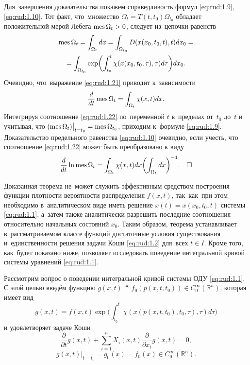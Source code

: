  Для~завершения доказательства покажем справедливость формул \eqref{eq:rud:1.9}, \eqref{eq:rud:1.10}.
 Тот факт, что~множество $\Omega_t=T(t,t_0)\Omega_{t_0}$ обладает положительной
 мерой Лебега $\mathop{\rm mes}\Omega_t>0$, следует из~цепочки равенств
 \begin{multline}
\mathop{\rm mes}\Omega_t=\int _{\Omega_t}dx=\int _{\Omega_{t_0}}D(x(x_0,t_0,t),t)dx_0= \\  =
\int _{\Omega_{t_0}}\exp\biggl(\int _{t_0}^{t}\chi(x(x_0,t_0,\tau),\tau)d\tau\biggr)dx_0.\label{eq:rud:1.21}
\end{multline}
Очевидно, что~выражение \eqref{eq:rud:1.21} приводит к~зависимости
\begin{equation}
\frac{d}{dt}\mathop{\rm mes}\Omega_t=\int _{\Omega_t}\chi(x,t)dx.\label{eq:rud:1.22}
\end{equation}
Интегрируя соотношение \eqref{eq:rud:1.22} по~переменной $t$
в~пределах от~$t_0$ до~$t$ и учитывая, что
$(\mathop{\rm mes}\Omega_t)\big|_{t=t_0}=\mathop{\rm mes}\Omega_{t_0}$, приходим к~формуле \eqref{eq:rud:1.9}. Доказательство предельного равенства
\eqref{eq:rud:1.10} очевидно, если учесть, что соотношение
\eqref{eq:rud:1.22} может быть преобразовано к виду
\begin{equation}
\frac{d}{dt}\ln
\mathop{\rm mes}\Omega_t={\int _{\Omega_t}\chi(x,t)dx} \biggl({\int _{\Omega_t}dx}\biggr)^{-1}.\label{eq:rud:1.23} \quad \square
\end{equation}

\smallskip

Доказанная теорема не~может служить эффективным средством
построения функции плотности вероятности распределения $f(x,t)$,
так~как~при этом необходимо в~аналитическом виде иметь решение
$x(t)=x(x_0,t_0,t)$ системы \eqref{eq:rud:1.1}, а~затем также
аналитически разрешить последние соотношения относительно
начальных состояний $x_0$. Таким образом, теорема устанавливает
в~рассматриваемом классе функций достаточные условия существования
и~единственности решения задачи Коши  \eqref{eq:rud:1.2} для~всех
$t\in I$. Кроме того, как~будет показано ниже, позволяет
исследовать поведение интегральной кривой системы уравнений
\eqref{eq:rud:1.1}.

\smallskip

 Рассмотрим вопрос о
поведении интегральной кривой системы ОДУ \eqref{eq:rud:1.1}. С
этой целью введём функцию $g(x,t)\triangleq f_0(p(x,t,t_0))\in
C_0^{\infty}(\mathbb R^n)$, которая имеет вид
\begin{equation}
g(x,t)=f(x,t) \exp{\biggl(\int _{t_0}^{t}\chi(x(p(x,t,t_0),t_0,\tau),\tau)d\tau\biggr)}\label{eq:rud:2.1}
\end{equation}
и удовлетворяет задаче Коши
\begin{equation}
\frac{\partial}{\partial
t}g(x,t)+\sum\limits_{i=1}^{n}X_i(x,t)\frac{\partial}{\partial
x_i}g(x,t)=0,\label{eq:rud:2.2}
\end{equation}
$$
g(x,t)\big|_{t=t_0}=g_0(x)=f_0(x)\in C_0^{\infty}(\mathbb R^n).
$$

